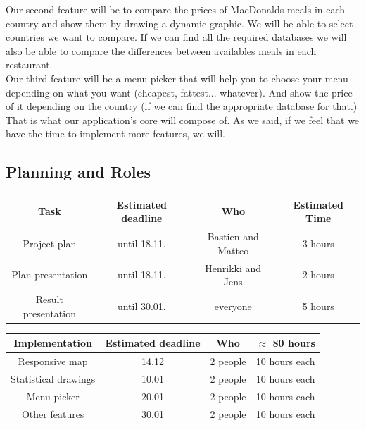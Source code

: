 \documentclass[12pt]{article}
\begin{document}
        \noindent Our second feature will be to compare the prices of MacDonalds meals
        in each country and show them by drawing a dynamic graphic. We will be
        able to select countries we want to compare. If we can find all the
        required databases we will also be able to compare the differences
        between availables meals in each restaurant.\\

        \noindent Our third feature will be a menu picker that will help you to choose
        your menu depending on what you want (cheapest, fattest... whatever).
        And show the price of it depending on the country (if we can find the
        appropriate database for that.)\\

        \noindent That is what our application's core will compose of. As we said, if we feel
        that we have the time to implement more features, we will.

        \newpage

        {\color{color_subsection}\subsection{Planning and Roles}}
        \vspace{1em}
           
	\begin{center}
	    \begin{tabular}{ |c|c|c|c| } 
 	        \hline
	        \textbf{Task} & \textbf{Estimated deadline} & \textbf{Who} & \textbf{Estimated Time}  \\
	        \hline
 	        Project plan & until 18.11. & Bastien and Matteo & 3 hours \\ 
 	        \hline
 	        Plan presentation & until 18.11. & Henrikki and Jens & 2 hours \\
            \hline 
            Result presentation & until 30.01. & everyone & 5 hours \\ 
            \hline 
        \end{tabular}
    \end{center}
    
    \begin{center}
        \begin{tabular}{ |c|c|c|c| } 
            \hline
            \textbf{Implementation} & \textbf{Estimated deadline} & \textbf{Who} & \textbf{$\approx$ 80 hours} \\
            \hline
            Responsive map & 14.12 & 2 people & 10 hours each \\
            \hline
 	        Statistical drawings & 10.01 & 2 people & 10 hours each\\  
            \hline
            Menu picker & 20.01 & 2 people & 10 hours each \\
            \hline
            Other features & 30.01 & 2 people & 10 hours each \\
	        \hline
	    \end{tabular}
    \end{center}
    
\end{document}
